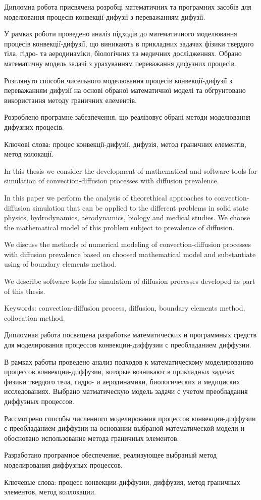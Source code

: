 Дипломна робота присвячена розробці математичних та програмних засобів для моделювання процесів конвекції-дифузії з переважанням дифузії.

У рамках роботи проведено аналіз підходів до математичного моделювання процесів конвекції-дифузії, що виникають в прикладних задачах фізики твердого тіла, гідро- та аеродинаміки, біологічних та медичних дослідженнях. Обрано математичну модель задачі з урахуванням переважання дифузних процесів.

Розглянуто способи чисельного моделювання процесів конвекції-дифузії з переважанням дифузії на основі обраної математичної моделі та обгрунтовано використання методу граничних елементів.

Розроблено програмне забезпечення, що реалізовує обрані методи моделювання дифузних процесів.

Ключові слова: процес конвекції-дифузії, дифузія, метод граничних елементів, метод колокації.

In this thesis we consider the development of mathematical and software tools for simulation of convection-diffusion processes with diffusion prevalence.

In this paper we perform the analysis of theorethical approaches to convection-diffusion simulation that can be applied to the different problems in solid state physics, hydrodynamics, aerodynamics, biology and medical studies. We choose the mathematical model of this problem subject to prevalence of diffusion.

We discuss the methods of numerical modeling of convection-diffusion processes with diffusion prevalence based on choosed mathematical model and substantiate using of boundary elements method.

We describe software tools for simulation of diffusion processes developed as part of this thesis.

Keywords: convection-diffusion process, diffusion, boundary elements method, collocation method.

Дипломная работа посвящена разработке математических и программных средств для моделирования процессов конвекции-диффузии с преобладанием диффузии.

В рамках работы проведено анализ подходов к математическому моделированию процессов конвекции-диффузии, которые возникают в прикладных задачах физики твердого тела, гидро- и аеродинамики, биологических и медициских исследованиях. Выбрано матматическую модель задачи с учетом преобладания диффузных процессов.

Рассмотрено способы численного моделирования процессов конвекции-диффузии с преобладанием диффузии на основании выбраной математической модели и обосновано использование метода граничных элементов.

Разработано програмное обеспечение, реализующее выбраный метод моделирования диффузных процессов.

Ключевые слова: процесс конвекции-диффузии, диффузия, метод граничных элементов, метод коллокации.
